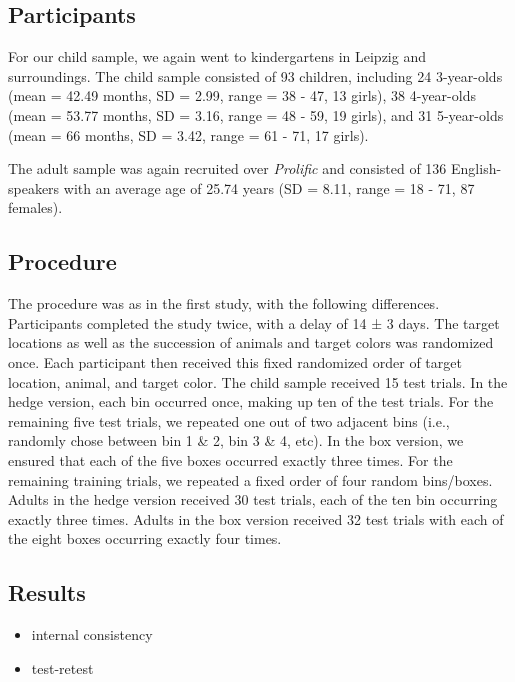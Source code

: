 \documentclass[
  man,floatsintext]{apa6}
\providecommand{\tightlist}{%
  \setlength{\itemsep}{0pt}\setlength{\parskip}{0pt}}
\begin{document}
\hypertarget{participants-1}{%
\subsection{Participants}\label{participants-1}}

For our child sample, we again went to kindergartens in Leipzig and surroundings.
The child sample consisted of
93 children, including
24 3-year-olds
(mean = 42.49 months,
SD = 2.99,
range = 38
- 47,
13 girls),
38 4-year-olds
(mean = 53.77 months,
SD = 3.16,
range = 48
- 59,
19 girls),
and 31 5-year-olds
(mean = 66 months,
SD = 3.42,
range = 61
- 71,
17 girls).

The adult sample was again recruited over \emph{Prolific} and consisted of 136 English-speakers with an average age of 25.74 years (SD = 8.11, range = 18 - 71, 87 females).

\hypertarget{procedure-2}{%
\subsection{Procedure}\label{procedure-2}}

The procedure was as in the first study, with the following differences. Participants completed the study twice, with a delay of 14 ± 3 days.
The target locations as well as the succession of animals and target colors was randomized once. Each participant then received this fixed randomized order of target location, animal, and target color.
The child sample received 15 test trials. In the hedge version, each bin occurred once, making up ten of the test trials. For the remaining five test trials, we repeated one out of two adjacent bins (i.e., randomly chose between bin 1 \& 2, bin 3 \& 4, etc). In the box version, we ensured that each of the five boxes occurred exactly three times. For the remaining training trials, we repeated a fixed order of four random bins/boxes.
Adults in the hedge version received 30 test trials, each of the ten bin occurring exactly three times. Adults in the box version received 32 test trials with each of the eight boxes occurring exactly four times.

\hypertarget{results-4}{%
\subsection{Results}\label{results-4}}

\begin{itemize}
\tightlist
\item
  internal consistency
\item
  test-retest
\end{itemize}
\end{document}
